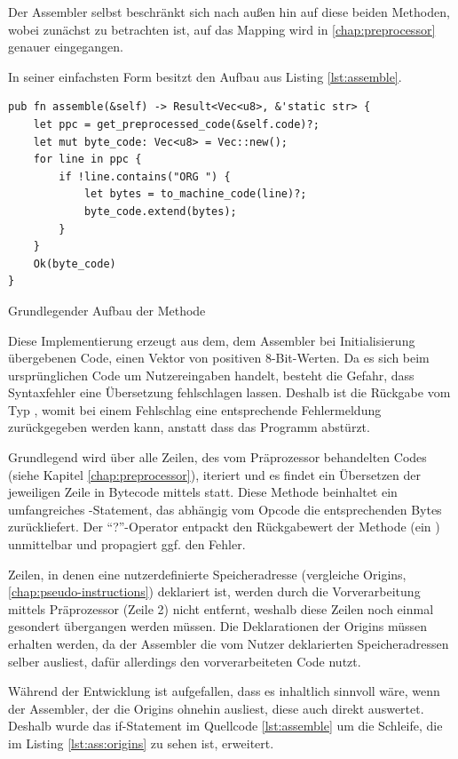 Der Assembler selbst beschränkt sich nach außen hin auf diese beiden Methoden, wobei zunächst  zu betrachten ist, auf das Mapping wird in \ref{chap:preprocessor} genauer eingegangen.

In seiner einfachsten Form besitzt  den Aufbau aus Listing \ref{lst:assemble}.

\begin{listing}[ht]
\begin{verbatim}
pub fn assemble(&self) -> Result<Vec<u8>, &'static str> {
    let ppc = get_preprocessed_code(&self.code)?;
    let mut byte_code: Vec<u8> = Vec::new();
    for line in ppc {
        if !line.contains("ORG ") {
            let bytes = to_machine_code(line)?;
            byte_code.extend(bytes);
        }
    }
    Ok(byte_code)
}
\end{verbatim}
\label{lst:assemble}
\caption{Grundlegender Aufbau der Methode }
\end{listing}

Diese Implementierung erzeugt aus dem, dem Assembler bei Initialisierung übergebenen Code, einen Vektor von positiven 8-Bit-Werten. Da es sich beim ursprünglichen Code um Nutzereingaben handelt, besteht die Gefahr, dass Syntaxfehler eine Übersetzung fehlschlagen lassen. Deshalb ist die Rückgabe vom Typ , womit bei einem Fehlschlag eine entsprechende Fehlermeldung zurückgegeben werden kann, anstatt dass das Programm abstürzt.

Grundlegend wird über alle Zeilen, des vom Präprozessor behandelten Codes (siehe Kapitel \ref{chap:preprocessor}), iteriert und es findet ein Übersetzen der jeweiligen Zeile in Bytecode mittels  statt. Diese Methode beinhaltet ein umfangreiches -Statement, das abhängig vom Opcode die entsprechenden Bytes zurückliefert. Der \enquote{?}-Operator entpackt den Rückgabewert der Methode (ein ) unmittelbar und propagiert ggf. den Fehler.

Zeilen, in denen eine nutzerdefinierte Speicheradresse (vergleiche Origins, \ref{chap:pseudo-instructions}) deklariert ist, werden durch die Vorverarbeitung mittels Präprozessor (Zeile 2) nicht entfernt, weshalb diese Zeilen noch einmal gesondert übergangen werden müssen. Die Deklarationen der Origins müssen erhalten werden, da der Assembler die vom Nutzer deklarierten Speicheradressen selber ausliest, dafür allerdings den vorverarbeiteten Code nutzt.

Während der Entwicklung ist aufgefallen, dass es inhaltlich sinnvoll wäre, wenn der Assembler, der die Origins ohnehin ausliest, diese auch direkt auswertet. Deshalb wurde das if-Statement im Quellcode \ref{lst:assemble} um die Schleife, die im Listing \ref{lst:ass:origins} zu sehen ist, erweitert.


